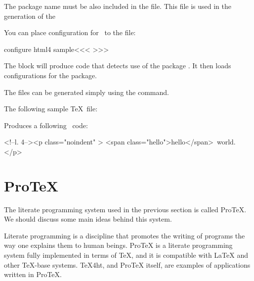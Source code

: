 The package name must be also included in the  file. This file is used in the generation of the 

\begin{texsource}
\end{texsource}

You can place configuration for \HTML\ to the  file:

\begin{texsource}
\<configure html4 sample\><<<
>>>
\end{texsource}

The  block will produce code that 
detects use of the package . It then loads configurations
for the package.


The  files can be generated simply using the  command.

The following sample \TeX\ file:


Produces a following \HTML\ code:

\begin{htmlsource}
<!--l. 4--><p class="noindent" >
<span class="hello">hello</span> world. 
</p> 
\end{htmlsource}




\section{ProTeX}


The literate programming system used in the previous section is called ProTeX. We should discuss some main ideas behind this system.


Literate programming is a discipline that promotes the writing of programs the
way one explains them to human beings. ProTeX is a literate programming system
fully implemented in terms of TeX, and it is compatible with LaTeX and other
TeX-base systems. TeX4ht, and ProTeX itself, are examples of applications
written in ProTeX.


